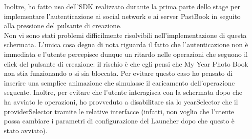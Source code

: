 				Inoltre, ho fatto uso dell'SDK realizzato durante la prima parte dello stage per implementare l'autenticazione ai
				social network e ai server PastBook in seguito alla pressione del pulsante di creazione.\\
				Non vi sono stati problemi difficilmente risolvibili nell'implementazione di questa schermata. L'unica cosa degna di
				nota riguarda il fatto che l'autenticazione non è immediata e l'utente percepisce dunque un ritardo nelle operazioni
				che seguono il click del pulsante di creazione: il rischio è che egli pensi che My Year Photo Book non stia
				funzionando o si sia bloccata. Per evitare questo caso ho pensato di inserire una semplice animazione che
				simulasse il caricamento dell'operazione seguente. Inoltre, per evitare che l'utente interagisca con la schermata
				dopo che ha avviato le operazioni, ho provveduto a disabilitare sia lo yearSelector che il providerSelector tramite
				le relative interfacce (infatti, non voglio che l'utente possa cambiare i parametri di configurazione del Launcher
				dopo che questo è stato avviato).
